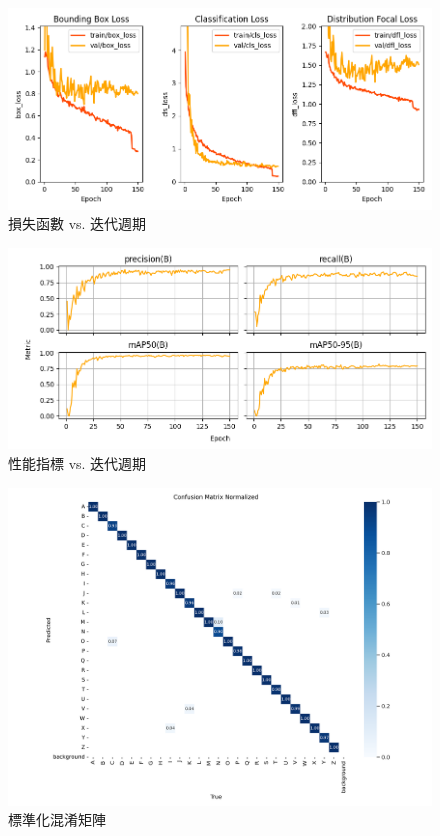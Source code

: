\documentclass[conference]{IEEEtran}
\begin{document}
\begin{figure}[htbp]
    \centering
    \includegraphics[width=\linewidth]{losses_epoch_detection_20240901.png}
    \caption{損失函數 vs. 迭代週期}
    \label{fig:loss-epoch}
\end{figure}

\begin{figure}[htbp]
    \centering
    \includegraphics[width=\linewidth]{metrics_epoch_detection_20240901.png}
    \caption{性能指標 vs. 迭代週期}
    \label{fig:metric-epoch}
\end{figure}


\begin{figure}[htbp]
    \centering
    \includegraphics[width=\linewidth]{confusion_matrix_normalized.png}
    \caption{標準化混淆矩陣}
    \label{fig:normalized-epoch}
\end{figure}
\end{document}

